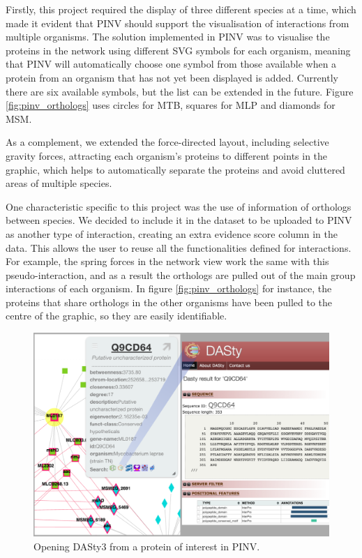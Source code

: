 Firstly, this project required the display of three different species at a time, which made it evident that PINV should support the visualisation of interactions from multiple organisms. The  solution implemented in PINV was to visualise the proteins in the network using different SVG symbols for each organism,  meaning that PINV will automatically choose one symbol from those available when a protein from an organism that has not yet been displayed is added. Currently there are six available symbols, but the list can be extended in the future. Figure \ref{fig:pinv_orthologs} uses circles for MTB, squares for MLP and diamonds for MSM.

As a complement, we extended the force-directed layout, including selective gravity forces, attracting each organism's proteins to different points in the graphic, which helps to automatically separate the proteins and avoid cluttered areas of multiple species.

One characteristic specific to this project was the use of information of orthologs between species. We decided to include it in the dataset to be uploaded to PINV as another type of interaction, creating an extra evidence score column in the data. This allows the user to reuse all the functionalities defined for interactions. For example, the spring forces in the network view work the same with this pseudo-interaction, and as a result the orthologs are pulled out of the main group interactions of each organism. In figure \ref{fig:pinv_orthologs} for instance, the proteins that share orthologs in the other organisms have been pulled to the centre of the graphic, so they are easily identifiable.

\begin{figure}
\centering
\includegraphics[width=5in]{figures/pinv2dasty.png}
\caption[Opening DASty3 from a protein of interest in PINV.]{Opening DASty3 from a protein of interest in PINV.
\label{fig:pinv2dasty}}
\end{figure}

